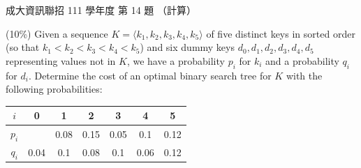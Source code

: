 \begin{pastexam}[label={px:ncku-111-prog-14}]{成大資訊聯招 111 學年度 第 14 題}
（計算）

(10\%) Given a sequence $K=\langle k_1,k_2,k_3,k_4,k_5\rangle$ of five distinct keys in sorted order (so that $k_1<k_2<k_3<k_4<k_5$) and six dummy keys $d_0,d_1,d_2,d_3,d_4,d_5$ representing values not in $K$, we have a probability $p_i$ for $k_i$ and a probability $q_i$ for $d_i$. Determine the cost of an optimal binary search tree for $K$ with the following probabilities:
\begin{center}
\begin{tabular}{|c|c|c|c|c|c|c|}
\hline
$i$ & 0 & 1 & 2 & 3 & 4 & 5 \\ \hline
$p_i$ & & 0.08 & 0.15 & 0.05 & 0.1 & 0.12 \\ \hline
$q_i$ & 0.04 & 0.1 & 0.08 & 0.1 & 0.06 & 0.12 \\ \hline
\end{tabular}
\end{center}
\end{pastexam}

